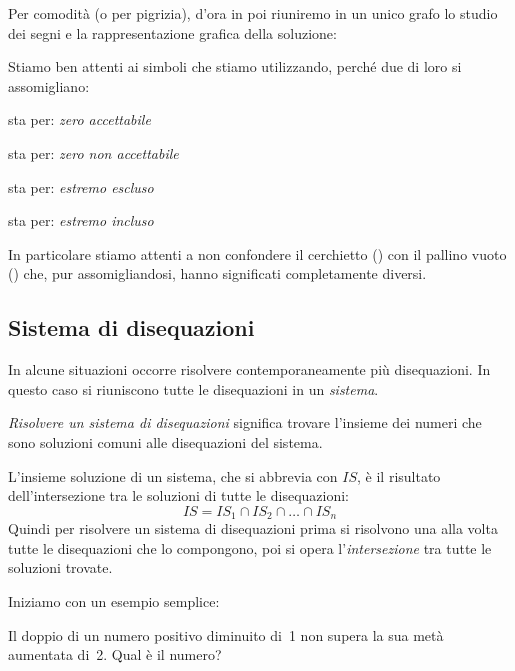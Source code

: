 \osservazione Per comodità (o per pigrizia), d'ora in poi riuniremo in un 
unico grafo lo studio dei segni e la rappresentazione grafica della soluzione: 

% 
  \soluzionefratta

Stiamo ben attenti ai simboli che stiamo utilizzando, perché due di loro si 
assomigliano:
\begin{multicols}{2}
%  
sta per: \emph{zero accettabile}

%  
sta per: \emph{zero non accettabile}

%  
sta per: \emph{estremo escluso}

%  
sta per: \emph{estremo incluso}
\end{multicols}

In particolare stiamo attenti a non confondere il cerchietto 
() 
con il pallino vuoto () che, pur assomigliandosi, 
hanno significati completamente diversi.

\subsection{Sistema di disequazioni}
\label{sec:dis_sistemi}

In alcune situazioni occorre risolvere contemporaneamente più disequazioni.
In questo caso si riuniscono tutte le disequazioni in un \emph{sistema}. 

\emph{Risolvere un sistema di disequazioni} significa trovare
l'insieme dei numeri che sono soluzioni comuni alle disequazioni del sistema.

L'insieme soluzione di un sistema, che si abbrevia con \(IS\), è 
il risultato dell'intersezione tra le soluzioni di tutte le disequazioni:
\[IS = IS_{1} \cap IS_{2} \cap \dots \cap IS_{n}\]
Quindi per risolvere un sistema di disequazioni prima si risolvono una alla 
volta tutte le disequazioni che lo compongono, 
poi si opera l'\emph{intersezione} tra tutte le soluzioni trovate. 

Iniziamo con un esempio semplice:

\begin{problema}
Il doppio di un numero positivo diminuito di~1 non supera la sua
metà aumentata di~2. Qual è il numero?
\end{problema}

